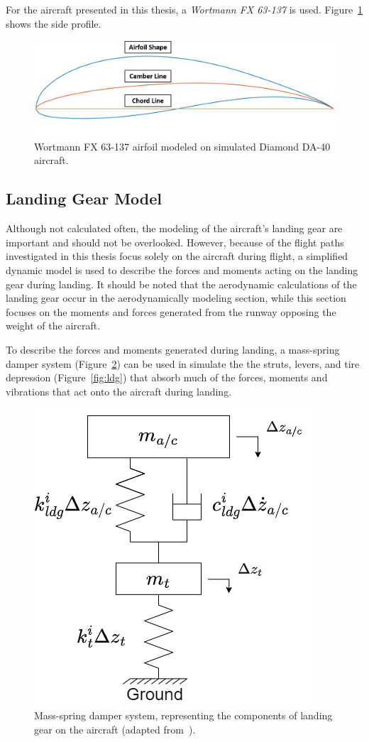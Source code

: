 \documentclass[12pt]{report}
\begin{document}
For the aircraft presented in this thesis, a \textit{Wortmann FX 63{-}137} is used. Figure~\ref{fig:airfoil} shows the side profile.

\begin{figure}[!ht]\label{fig:airfoil}
  \centering
  \includegraphics[width=\linewidth]{Figures/da40airfoil.png}
  \caption{Wortmann FX 63{-}137 airfoil modeled on simulated Diamond DA-40 aircraft.}
\end{figure}
\clearpage
\subsection{Landing Gear Model}
Although not calculated often, the modeling of the aircraft's landing gear are important and should not be overlooked. However, because of the flight paths investigated in this thesis focus solely on the aircraft during flight, a simplified dynamic model is used to describe the forces and moments acting on the landing gear during landing. It should be noted that the aerodynamic calculations of the landing gear occur in the aerodynamically modeling section, while this section focuses on the moments and forces generated from the runway opposing the weight of the aircraft.

To describe the forces and moments generated during landing, a mass-spring damper system (Figure~\ref{fig:ldgfbd}) can be used in simulate the the struts, levers, and tire depression (Figure~\ref{fig:ldg}) that absorb much of the forces, moments and vibrations that act onto the aircraft during landing.

\begin{figure}[!ht]\label{fig:ldgfbd}
  \centering
  \includegraphics[width=.4\linewidth]{Figures/ldgfbd.drawio.png}
  \caption{Mass-spring damper system, representing the components of landing gear on the aircraft (adapted from~\cite{xingStrengthAnalysisDiagonal2012}).}
\end{figure}
\end{document}
